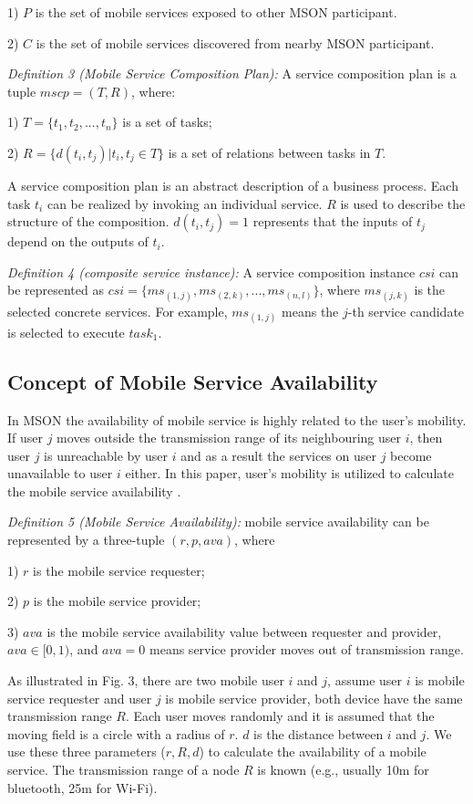 \documentclass[10pt,journal,compsoc]{IEEEtran}
\begin{document}
​1) $P$ is the set of mobile services exposed to other MSON participant.

​2) $C$ is the set of mobile services discovered from nearby MSON participant.

\textit{Definition 3 (Mobile Service Composition Plan):} A service composition plan is a tuple $mscp = (T, R)$, where:

​1) $T = \{t_1,t_2,...,t_n\}$ is a set of tasks;

​2) $R = \{d(t_i,t_j)|t_i,t_j \in T\}$ is a set of relations between tasks in $T$.

​A service composition plan is an abstract description of a business process. Each task $t_i$ can be realized by invoking an individual service. $R$ is used to describe the structure of the composition. $d(t_i, t_j) = 1$ represents that the inputs of $t_j$ depend on the outputs of $t_i$.

\textit{Definition 4 (composite service instance):} A service composition instance $csi$ can be represented as $csi = \{ms_{(1,j)}, ms_{(2,k)},...,ms_{(n,l)}\}$, where $ms_{(j,k)}$ is the selected concrete services. For example, $ms_{(1,j)}$ means the $j$-th service candidate is selected to execute $task_1$.

\subsection{Concept of Mobile Service Availability}
In MSON the availability of mobile service is highly related to the user's mobility. If user $j$ moves outside the transmission range of its neighbouring user $i$, then user $j$ is unreachable by user $i$ and as a result the services on user $j$ become unavailable to user $i$ either. In this paper, user's mobility is utilized to calculate the mobile service availability \cite{Yang2010}.

\textit{Definition 5 (Mobile Service Availability):} mobile service availability can be represented by a three-tuple $(r, p, ava) $, where

​1) $r$ is the mobile service requester;

​2) $p$ is the mobile service provider;

​3) $ava$ is the mobile service availability value between requester and provider, $ava \in [0,1)$, and $ava=0$ means service provider moves out of transmission range.

As illustrated in Fig. 3, there are two mobile user $i$ and $j$, assume user $i$ is mobile service requester and user $j$ is mobile service provider, both device have the same transmission range $R$. Each user moves randomly and it is assumed that the moving field is a circle with a radius of $r$. $d$ is the distance between $i$ and $j$. We use these three parameters ($r,R,d$) to calculate the availability of a mobile service. The transmission range of a node $R$ is known (e.g., usually 10m for bluetooth, 25m for Wi-Fi). 
\end{document}

